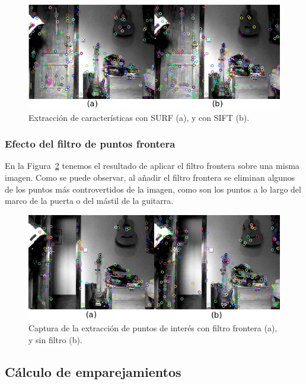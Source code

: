 \begin{figure}[th]
\centering
\includegraphics[scale=0.6]{Figures/tests/sift-surf.png}
\decoRule
\caption[Extracción de características con SURF y con SIFT]{Extracción de características con SURF (a), y con SIFT (b).}
\label{fig:sift-surf}
\end{figure}

\subsubsection{Efecto del filtro de puntos frontera}

En la Figura~\ref{fig:borderfilter} tenemos el resultado de aplicar el filtro frontera sobre una misma imagen. Como se puede observar, al añadir el filtro frontera se eliminan algunos de los puntos más controvertidos de la imagen, como son los puntos a lo largo del marco de la puerta o del mástil de la guitarra.

\begin{figure}[th]
\centering
\includegraphics[scale=0.7]{Figures/tests/borderfilter.png}
\decoRule
\caption[Captura de la extracción de puntos de interés con filtro frontera]{Captura de la extracción de puntos de interés con filtro frontera (a), y sin filtro (b).}
\label{fig:borderfilter}
\end{figure}

\subsection{Cálculo de emparejamientos}

